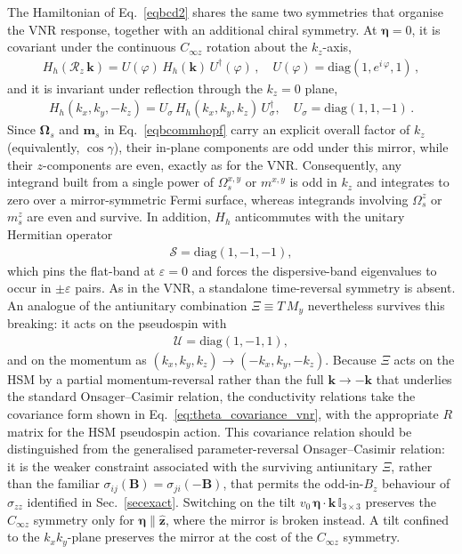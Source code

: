 \documentclass[aps,prb,onecolumn,nofootinbib,citeautoscript,10pt]{revtex4-2}
\newcommand{\bs}[1]{\boldsymbol{#1}}
\begin{document}
The Hamiltonian of Eq.~\eqref{eqbcd2} shares the same two symmetries that
organise the VNR response, together with an additional chiral symmetry. At
$\bs \eta = 0$, it is covariant under the continuous $C_{\infty z}$ rotation
about the $k_z$-axis,
\begin{align}
H_h (\mathcal R_z \, \bs k)=U(\varphi) \, H_h (\bs k) \, U^\dagger(\varphi)\,,
\quad U(\varphi) = \text{diag} (1, e^{i \, \varphi}, 1)\,,
\end{align}
and it is invariant under reflection through the $k_z=0$ plane,
\begin{align}
H_h (k_x, k_y, -k_z)= U_\sigma \, H_h (k_x,k_y,k_z) \, U_\sigma^\dagger,
\quad U_\sigma = \text{diag}(1,1,-1)\,.
\end{align}
Since $\bs \Omega_s$ and $\bs m_s$ in Eq.~\eqref{eqbcommhopf} carry an
explicit overall factor of $k_z$ (equivalently, $\cos \gamma$), their in-plane
components are odd under this mirror, while their $z$-components are even,
exactly as for the VNR. Consequently, any integrand built from a single power
of $\Omega_s^{x,y}$ or $m^{x,y}$ is odd in $k_z$ and integrates to zero over a
mirror-symmetric Fermi surface, whereas integrands involving $\Omega_s^z$ or
$m_s^z$ are even and survive. In addition, $H_h$ anticommutes with the unitary Hermitian operator
\begin{align}
\mathcal S = \text{diag} (1,-1,-1),
\end{align}
which pins the flat-band at $\varepsilon = 0$ and forces the dispersive-band
eigenvalues to occur in $\pm \varepsilon$ pairs.
As in the VNR, a standalone time-reversal symmetry is absent. An analogue of
the antiunitary combination $\Xi \equiv T\,M_y$ nevertheless survives this
breaking: it acts on the pseudospin with
\begin{align}
\mathcal U = \mathrm{diag}(1, -1, 1),
\end{align}
and on the momentum as $(k_x, k_y, k_z) \to(-k_x, k_y, -k_z)$.
Because $\Xi$ acts on the HSM by a partial momentum-reversal rather than the
full $\bs k \to -\bs k$ that underlies the standard Onsager--Casimir relation,
the conductivity relations take the covariance form shown in
Eq.~\eqref{eq:theta_covariance_vnr}, with the appropriate $R$ matrix for the
HSM pseudospin action. This covariance relation should be distinguished from
the generalised parameter-reversal Onsager--Casimir relation: it is the
weaker constraint associated with the surviving antiunitary $\Xi$, rather
than the familiar $\sigma_{ij}(\bs B)=\sigma_{ji}(-\bs B)$, that permits the
odd-in-$B_z$ behaviour of $\sigma_{zz}$ identified in Sec.~\ref{secexact}.
Switching on the tilt $v_0\,\bs \eta \cdot \bs k \, \mathbb{I}_{3 \times 3}$
preserves the $C_{\infty z}$ symmetry only for $\bs \eta \parallel \hat{\bs z}$,
where the mirror is broken instead. A tilt confined to the $k_x k_y$-plane
preserves the mirror at the cost of the $C_{\infty z}$ symmetry.
\end{document}
